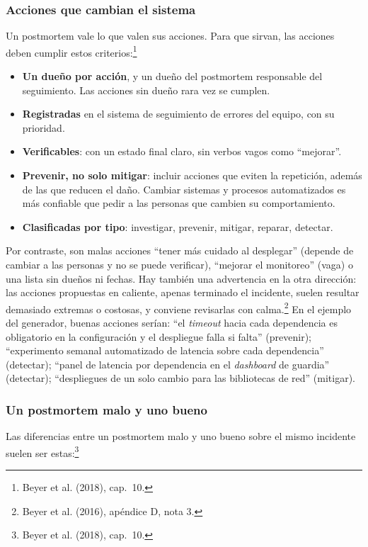 \documentclass[variant=apuntes,cover=institutional,mode=screen]{ua-engineering-v6-article}
\begin{document}
\subsubsection{Acciones que cambian el sistema}

Un postmortem vale lo que valen sus acciones. Para que sirvan, las acciones deben cumplir estos criterios:\footnote{Beyer et al. (2018), cap.~10.}
\begin{itemize}
\item \textbf{Un dueño por acción}, y un dueño del postmortem responsable del seguimiento. Las acciones sin dueño rara vez se cumplen.
\item \textbf{Registradas} en el sistema de seguimiento de errores del equipo, con su prioridad.
\item \textbf{Verificables}: con un estado final claro, sin verbos vagos como ``mejorar''.
\item \textbf{Prevenir, no solo mitigar}: incluir acciones que eviten la repetición, además de las que reducen el daño. Cambiar sistemas y procesos automatizados es más confiable que pedir a las personas que cambien su comportamiento.
\item \textbf{Clasificadas por tipo}: investigar, prevenir, mitigar, reparar, detectar.
\end{itemize}

Por contraste, son malas acciones ``tener más cuidado al desplegar'' (depende de cambiar a las personas y no se puede verificar), ``mejorar el monitoreo'' (vaga) o una lista sin dueños ni fechas. Hay también una advertencia en la otra dirección: las acciones propuestas en caliente, apenas terminado el incidente, suelen resultar demasiado extremas o costosas, y conviene revisarlas con calma.\footnote{Beyer et al. (2016), apéndice D, nota 3.} En el ejemplo del generador, buenas acciones serían: ``el \emph{timeout} hacia cada dependencia es obligatorio en la configuración y el despliegue falla si falta'' (prevenir); ``experimento semanal automatizado de latencia sobre cada dependencia'' (detectar); ``panel de latencia por dependencia en el \emph{dashboard} de guardia'' (detectar); ``despliegues de un solo cambio para las bibliotecas de red'' (mitigar).

\subsubsection{Un postmortem malo y uno bueno}

Las diferencias entre un postmortem malo y uno bueno sobre el mismo incidente suelen ser estas:\footnote{Beyer et al. (2018), cap.~10.}
\end{document}
